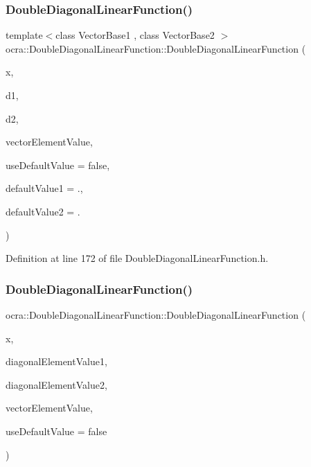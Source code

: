 \subsubsection{\texorpdfstring{Double\+Diagonal\+Linear\+Function()}{DoubleDiagonalLinearFunction()}\hspace{0.1cm}{\footnotesize\ttfamily [3/4]}}
{\footnotesize\ttfamily template$<$class Vector\+Base1 , class Vector\+Base2 $>$ \\
ocra\+::\+Double\+Diagonal\+Linear\+Function\+::\+Double\+Diagonal\+Linear\+Function (\begin{DoxyParamCaption}\item[{\hyperlink{classocra_1_1Variable}{Variable} \&}]{x,  }\item[{const Vector\+Base1 \&}]{d1,  }\item[{const Vector\+Base2 \&}]{d2,  }\item[{const double}]{vector\+Element\+Value,  }\item[{const bool}]{use\+Default\+Value = {\ttfamily false},  }\item[{const double}]{default\+Value1 = {.},  }\item[{const double}]{default\+Value2 = {.} }\end{DoxyParamCaption})\hspace{0.3cm}{\ttfamily [inline]}}



Definition at line 172 of file Double\+Diagonal\+Linear\+Function.\+h.

\hypertarget{classocra_1_1DoubleDiagonalLinearFunction_aa46fa50d5728569eb834438dfd3a9228}{}\label{classocra_1_1DoubleDiagonalLinearFunction_aa46fa50d5728569eb834438dfd3a9228} 
\subsubsection{\texorpdfstring{Double\+Diagonal\+Linear\+Function()}{DoubleDiagonalLinearFunction()}\hspace{0.1cm}{\footnotesize\ttfamily [4/4]}}
{\footnotesize\ttfamily ocra\+::\+Double\+Diagonal\+Linear\+Function\+::\+Double\+Diagonal\+Linear\+Function (\begin{DoxyParamCaption}\item[{\hyperlink{classocra_1_1Variable}{Variable} \&}]{x,  }\item[{const double}]{diagonal\+Element\+Value1,  }\item[{const double}]{diagonal\+Element\+Value2,  }\item[{const double}]{vector\+Element\+Value,  }\item[{const bool}]{use\+Default\+Value = {\ttfamily false} }\end{DoxyParamCaption})}



